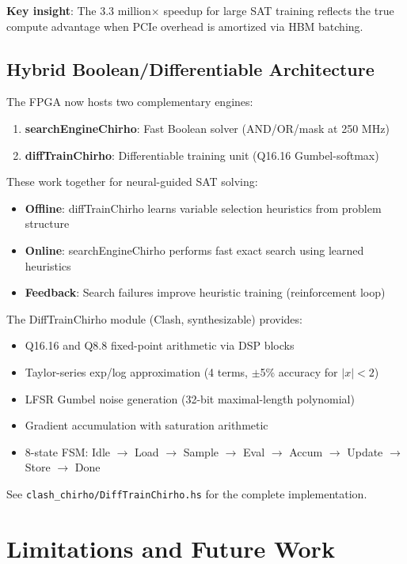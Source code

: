 \documentclass[11pt,a4paper]{article}
\begin{document}
\textbf{Key insight}: The 3.3 million$\times$ speedup for large SAT training
reflects the true compute advantage when PCIe overhead is amortized via HBM batching.

\subsection{Hybrid Boolean/Differentiable Architecture}
\label{subsec:hybrid_arch_chirho}

The FPGA now hosts two complementary engines:

\begin{enumerate}
  \item \textbf{searchEngineChirho}: Fast Boolean solver (AND/OR/mask at 250 MHz)
  \item \textbf{diffTrainChirho}: Differentiable training unit (Q16.16 Gumbel-softmax)
\end{enumerate}

These work together for neural-guided SAT solving:
\begin{itemize}
  \item \textbf{Offline}: diffTrainChirho learns variable selection heuristics from problem structure
  \item \textbf{Online}: searchEngineChirho performs fast exact search using learned heuristics
  \item \textbf{Feedback}: Search failures improve heuristic training (reinforcement loop)
\end{itemize}

The DiffTrainChirho module (Clash, synthesizable) provides:
\begin{itemize}
  \item Q16.16 and Q8.8 fixed-point arithmetic via DSP blocks
  \item Taylor-series exp/log approximation (4 terms, $\pm$5\% accuracy for $|x| < 2$)
  \item LFSR Gumbel noise generation (32-bit maximal-length polynomial)
  \item Gradient accumulation with saturation arithmetic
  \item 8-state FSM: Idle $\to$ Load $\to$ Sample $\to$ Eval $\to$ Accum $\to$ Update $\to$ Store $\to$ Done
\end{itemize}

See \texttt{clash\_chirho/DiffTrainChirho.hs} for the complete implementation.

\section{Limitations and Future Work}
\label{sec:limitations_chirho}
\end{document}

